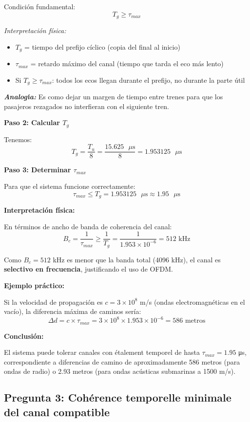 \documentclass[11pt,a4paper]{article}
\begin{document}
Condici\'on fundamental:
\[
T_g \geq \tau_{max}
\]

\textit{Interpretaci\'on f\'isica:}
\begin{itemize}
    \item $T_g$ = tiempo del prefijo c\'iclico (copia del final al inicio)
    \item $\tau_{max}$ = retardo m\'aximo del canal (tiempo que tarda el eco m\'as lento)
    \item Si $T_g \geq \tau_{max}$: todos los ecos llegan durante el prefijo, no durante la parte \'util
\end{itemize}

\textit{\textbf{Analog\'{\i}a:}} Es como dejar un margen de tiempo entre trenes para que los pasajeros rezagados no interfieran con el siguiente tren.

\textbf{Paso 2: Calcular $T_g$}

Tenemos:
\[
T_g = \frac{T_u}{8} = \frac{15.625 \text{ }\mu\text{s}}{8} = 1.953125 \text{ }\mu\text{s}
\]

\textbf{Paso 3: Determinar $\tau_{max}$}

Para que el sistema funcione correctamente:
\[
\boxed{\tau_{max} \leq T_g = 1.953125 \text{ }\mu\text{s} \approx 1.95 \text{ }\mu\text{s}}
\]

\textbf{Interpretaci\'on f\'isica:}

En t\'erminos de ancho de banda de coherencia del canal:
\[
B_c = \frac{1}{\tau_{max}} \geq \frac{1}{T_g} = \frac{1}{1.953 \times 10^{-6}} = 512 \text{ kHz}
\]

Como $B_c = 512$ kHz es menor que la banda total (4096 kHz), el canal es \textbf{selectivo en frecuencia}, justificando el uso de OFDM.

\textbf{Ejemplo pr\'actico:}

Si la velocidad de propagaci\'on es $c = 3 \times 10^8$ m/s (ondas electromagn\'eticas en el vac\'io), la diferencia m\'axima de caminos ser\'ia:
\[
\Delta d = c \times \tau_{max} = 3 \times 10^8 \times 1.953 \times 10^{-6} = 586 \text{ metros}
\]

\textbf{Conclusi\'on:}

El sistema puede tolerar canales con \'etalement temporel de hasta $\tau_{max} = 1.95$ μs, correspondiente a diferencias de camino de aproximadamente 586 metros (para ondas de radio) o 2.93 metros (para ondas ac\'usticas submarinas a 1500 m/s).

\subsection*{Pregunta 3: Coh\'erence temporelle minimale del canal compatible}
\end{document}
